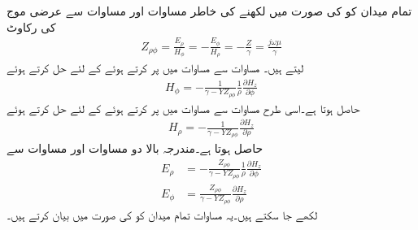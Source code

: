 تمام میدان کو  کی صورت میں لکھنے کی خاطر مساوات  اور مساوات  سے عرضی موج کی رکاوٹ 
\begin{align}\label{مساوات_مویج_نلکی_عرضی_برقی_رکاوٹ}
Z_{\rho \phi}=\frac{E_{\rho}}{H_{\phi}}=-\frac{E_{\phi}}{H_{\rho}}=-\frac{Z}{\gamma}=\frac{j\omega \mu}{\gamma}
\end{align}
لیتے ہیں۔  مساوات  سے  مساوات  میں پر کرتے ہوئے  کے لئے حل کرتے ہوئے
\begin{align}\label{مساوات_مویج_نلکی_مقناطیسی_زاویائی}
H_{\phi}=-\frac{1}{\gamma-YZ_{\rho \phi}} \frac{1}{\rho}\frac{\partial H_z}{\partial \phi} 
\end{align}
حاصل ہوتا ہے۔اسی طرح مساوات  سے  مساوات  میں پر کرتے ہوئے
 کے لئے حل کرتے ہوئے
\begin{align}\label{مساوات_مویج_نلکی_مقناطیسی_رداسی}
H_{\rho}=-\frac{1}{\gamma-YZ_{\rho \phi}}\frac{\partial H_z}{\partial \rho} 
\end{align}
حاصل ہوتا ہے۔مندرجہ بالا دو مساوات اور مساوات  سے
\begin{align}
E_{\rho}&=-\frac{Z_{\rho \phi}}{\gamma-YZ_{\rho \phi}} \frac{1}{\rho}\frac{\partial H_z}{\partial \phi} \label{مساوات_مویج_نلکی_برقی_رداسی} \\
E_{\phi}&=\frac{Z_{\rho \phi}}{\gamma-YZ_{\rho \phi}}\frac{\partial H_z}{\partial \rho} \label{مساوات_مویج_نلکی_برقی_زاویائی}
\end{align}
لکھے جا سکتے ہیں۔یہ مساوات تمام میدان کو  کی صورت میں بیان کرتے ہیں۔


